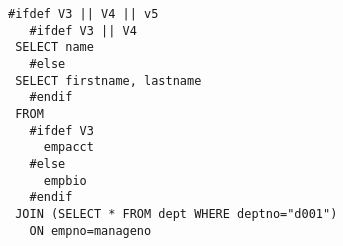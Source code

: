  \begin{lstlisting}[basicstyle=\footnotesize\ttfamily,columns=flexible,lineskip=0.5\baselineskip]
 #ifdef V3 || V4 || v5
   #ifdef V3 || V4
 SELECT name
   #else
 SELECT firstname, lastname
   #endif
 FROM
   #ifdef V3
     empacct
   #else
     empbio
   #endif
 JOIN (SELECT * FROM dept WHERE deptno="d001")
   ON empno=manageno  
 \end{lstlisting}


%
